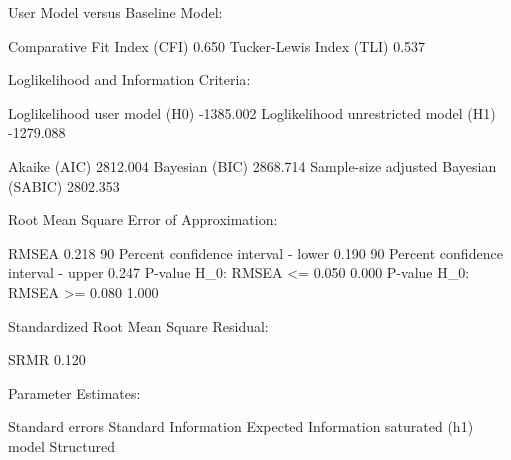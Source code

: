 \documentclass[
]{article}
\newenvironment{Shaded}{\begin{snugshade}}{\end{snugshade}}
\newcommand{\DecValTok}[1]{\textcolor[rgb]{0.00,0.00,0.81}{#1}}
\newcommand{\FloatTok}[1]{\textcolor[rgb]{0.00,0.00,0.81}{#1}}
\newcommand{\FunctionTok}[1]{\textcolor[rgb]{0.00,0.00,0.00}{#1}}
\newcommand{\NormalTok}[1]{#1}
\newcommand{\SpecialCharTok}[1]{\textcolor[rgb]{0.00,0.00,0.00}{#1}}
\begin{document}
\begin{Shaded}
\begin{Highlighting}[]
\NormalTok{User Model versus Baseline Model}\SpecialCharTok{:}

\NormalTok{  Comparative Fit }\FunctionTok{Index}\NormalTok{ (CFI)                    }\FloatTok{0.650}
\NormalTok{  Tucker}\SpecialCharTok{{-}}\NormalTok{Lewis }\FunctionTok{Index}\NormalTok{ (TLI)                       }\FloatTok{0.537}

\NormalTok{Loglikelihood and Information Criteria}\SpecialCharTok{:}

\NormalTok{  Loglikelihood user }\FunctionTok{model}\NormalTok{ (H0)              }\SpecialCharTok{{-}}\FloatTok{1385.002}
\NormalTok{  Loglikelihood unrestricted }\FunctionTok{model}\NormalTok{ (H1)      }\SpecialCharTok{{-}}\FloatTok{1279.088}
                                                      
  \FunctionTok{Akaike}\NormalTok{ (AIC)                                }\FloatTok{2812.004}
  \FunctionTok{Bayesian}\NormalTok{ (BIC)                              }\FloatTok{2868.714}
\NormalTok{  Sample}\SpecialCharTok{{-}}\NormalTok{size adjusted }\FunctionTok{Bayesian}\NormalTok{ (SABIC)       }\FloatTok{2802.353}

\NormalTok{Root Mean Square Error of Approximation}\SpecialCharTok{:}

\NormalTok{  RMSEA                                          }\FloatTok{0.218}
  \DecValTok{90}\NormalTok{ Percent confidence interval }\SpecialCharTok{{-}}\NormalTok{ lower         }\FloatTok{0.190}
  \DecValTok{90}\NormalTok{ Percent confidence interval }\SpecialCharTok{{-}}\NormalTok{ upper         }\FloatTok{0.247}
\NormalTok{  P}\SpecialCharTok{{-}}\NormalTok{value H\_0}\SpecialCharTok{:}\NormalTok{ RMSEA }\SpecialCharTok{\textless{}=} \FloatTok{0.050}                    \FloatTok{0.000}
\NormalTok{  P}\SpecialCharTok{{-}}\NormalTok{value H\_0}\SpecialCharTok{:}\NormalTok{ RMSEA }\SpecialCharTok{\textgreater{}=} \FloatTok{0.080}                    \FloatTok{1.000}

\NormalTok{Standardized Root Mean Square Residual}\SpecialCharTok{:}

\NormalTok{  SRMR                                           }\FloatTok{0.120}

\NormalTok{Parameter Estimates}\SpecialCharTok{:}

\NormalTok{  Standard errors                             Standard}
\NormalTok{  Information                                 Expected}
\NormalTok{  Information }\FunctionTok{saturated}\NormalTok{ (h1) model          Structured}


\end{Highlighting}
\end{Shaded}
\end{document}
